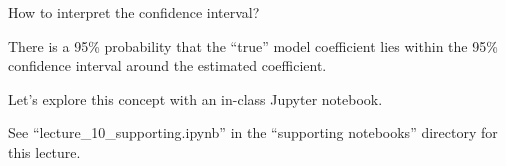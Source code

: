 \documentclass[aspectratio=169]{beamer}
\begin{document}
\begin{frame}{How to interpret the confidence interval?}

\pause

There is a 95\% probability that the ``true'' model coefficient lies within the 95\% confidence interval around the estimated coefficient.  

\vspace{5mm}

Let's explore this concept with an in-class Jupyter notebook.

\vspace{5mm}

  See ``lecture\_10\_supporting.ipynb'' in the ``supporting notebooks'' directory for this lecture.


\end{frame}
\end{document}
